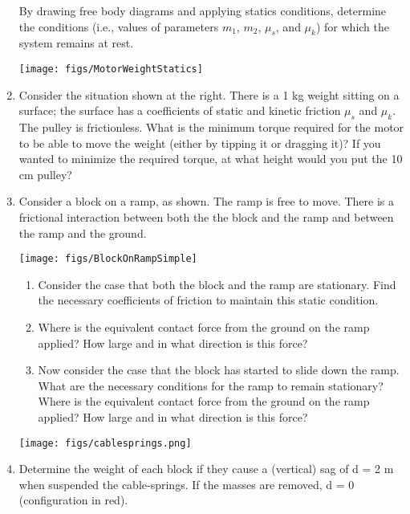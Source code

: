 \documentclass{tufte-handout}
\newcommand{\be}{\begin{enumerate}}
\newcommand{\ee}{\end{enumerate}}
\begin{document}
\begin{enumerate}[resume]
By drawing free body diagrams and applying statics conditions, determine the conditions (i.e., values of parameters $m_1$, $m_2$, $\mu_s$, and $\mu_k$) for which the system remains at rest.

\vfill
\begin{marginfigure} 
\texttt{[image: figs/MotorWeightStatics]}
\end{marginfigure}

\item Consider the situation shown at the right.  There is a 1 kg weight sitting on a surface; the surface has a coefficients of static and kinetic friction $\mu_s$ and $\mu_k$.  The pulley is frictionless.  What is the minimum torque required for the motor to be able to move the weight (either by tipping it or dragging it)?  If you wanted to minimize the required torque, at what height would you put the 10 cm pulley?



\clearpage

\item Consider a block on a ramp, as shown. The ramp is free to move.  There is a frictional interaction between both the the block and the ramp and between the ramp and the ground.  \begin{marginfigure} 
\texttt{[image: figs/BlockOnRampSimple]}
\end{marginfigure}

\be
\item Consider the case that both the block and the ramp are stationary.  Find the necessary coefficients of friction to maintain this static condition.

\item Where is the equivalent contact force from the ground on the ramp applied?  How large and in what direction is this force?

\item Now consider the case that the block has started to slide down the ramp.  What are the necessary conditions for the ramp to remain stationary?  Where is the equivalent contact force from the ground on the ramp applied?  How large and in what direction is this force?

\ee

\vfill

 \begin{marginfigure} 
\texttt{[image: figs/cablesprings.png]}
\end{marginfigure}
\item Determine the weight of each block if they cause a (vertical) sag of d = 2 m when suspended the cable-springs. If the masses are removed, d = 0 (configuration in red). 


\end{enumerate}
\end{document}
